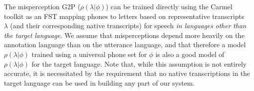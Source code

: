 The misperception G2P ($\rho(\lambda|\phi)$) can be trained directly
using the Carmel toolkit \cite{Carmel} as an FST mapping phones to
letters based on representative transcripts $\lambda$ (and their
corresponding native transcripts) for speech {\em in languages other
  than the target language}. We assume that misperceptions depend more
heavily on the annotation language than on the utterance language, and
that therefore a model $\rho(\lambda|\phi)$ trained using a universal
phone set for $\phi$ is also a good model of $\rho(\lambda|\phi)$ for
the target language. Note that, while this assumption is not entirely
accurate, it is necessitated by the requirement that no native
transcriptions in the target language can be used in building any part
of our system.

